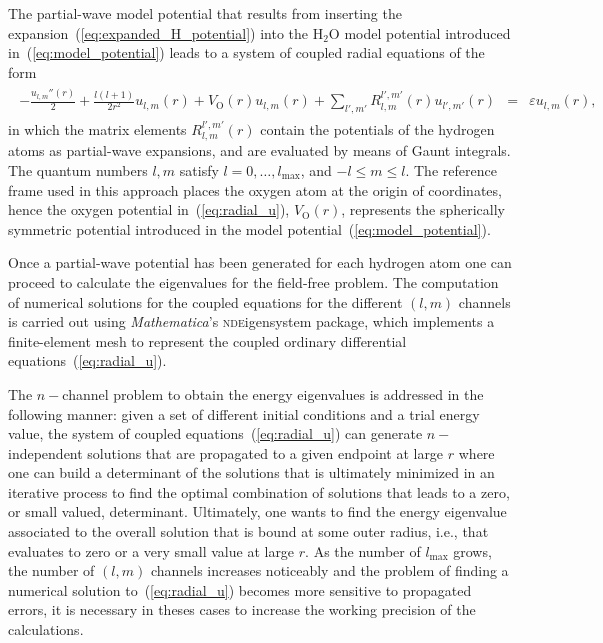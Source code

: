 The partial-wave model potential that results from inserting the
expansion~(\ref{eq:expanded_H_potential}) into the H$_{2}$O model
potential introduced in~(\ref{eq:model_potential}) leads to a system
of coupled radial equations of the form
%
\begin{eqnarray}
  \begin{split}
    -\frac{u_{l,m}''(r)}{2} + \frac{l(l + 1)}{2r^{2}} u_{l,m}(r)
    + V_{\mathrm{O}}(r) u_{l,m}(r) + \sum\limits_{l',m'}
    R_{l,m}^{l',m'}(r) u_{l',m'}(r) & = & \varepsilon u_{l,m}(r),
  \end{split}
  \label{eq:radial_u}
\end{eqnarray}
%
in which the matrix elements $R_{l,m}^{l',m'}(r)$ contain the
potentials of the hydrogen atoms as partial-wave expansions, and are
evaluated by means of Gaunt integrals. The quantum numbers $l,m$
satisfy $l = 0, \dots, l_{\mathrm{max}}$, and $-l \leq m \leq l$. The
reference frame used in this approach places the oxygen atom at the
origin of coordinates, hence the oxygen potential
in~(\ref{eq:radial_u}), $V_{\mathrm{O}}(r)$, represents the
spherically symmetric potential introduced in the model
potential~(\ref{eq:model_potential}).

Once a partial-wave potential has been generated for each hydrogen
atom one can proceed to calculate the eigenvalues for the field-free
problem. The computation of numerical solutions for the coupled
equations for the different $(l,m)$ channels is carried out using
\emph{Mathematica}'s \textsc{nde}igensystem package, which implements
a finite-element mesh to represent the coupled ordinary differential
equations~(\ref{eq:radial_u}).

The $n-$channel problem to obtain the energy eigenvalues is addressed
in the following manner: given a set of different initial conditions
and a trial energy value, the system of coupled
equations~(\ref{eq:radial_u}) can generate $n-$independent solutions
that are propagated to a given endpoint at large $r$ where one can
build a determinant of the solutions that is ultimately minimized in
an iterative process to find the optimal combination of solutions that
leads to a zero, or small valued, determinant. Ultimately, one wants
to find the energy eigenvalue associated to the overall solution that
is bound at some outer radius, i.e., that evaluates to zero or a very
small value at large $r$. As the number of $l_{\mathrm{max}}$ grows,
the number of $(l,m)$ channels increases noticeably and the problem of
finding a numerical solution to~(\ref{eq:radial_u}) becomes more
sensitive to propagated errors, it is necessary in theses cases to
increase the working precision of the calculations.

